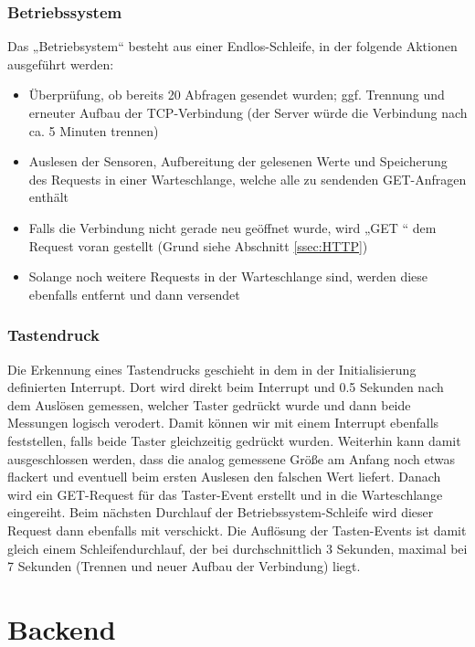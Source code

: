 \documentclass[12pt,a4paper,twoside]{article}
\begin{document}
\subsubsection{Betriebssystem}

Das „Betriebsystem“ besteht aus einer Endlos-Schleife, in der folgende Aktionen ausgeführt werden:
\begin{itemize}
 \item Überprüfung, ob bereits 20 Abfragen gesendet wurden; ggf. Trennung und erneuter Aufbau der TCP-Verbindung (der Server würde die Verbindung nach ca. 5 Minuten trennen)
 \item Auslesen der Sensoren, Aufbereitung der gelesenen Werte und Speicherung des Requests in einer Warteschlange, welche alle zu sendenden GET-Anfragen enthält
 \item Falls die Verbindung nicht gerade neu geöffnet wurde, wird „GET “ dem Request voran gestellt (Grund siehe Abschnitt \ref{ssec:HTTP})
 \item Solange noch weitere Requests in der Warteschlange sind, werden diese ebenfalls entfernt und dann versendet
\end{itemize}

\subsubsection{Tastendruck}
Die Erkennung eines Tastendrucks geschieht in dem in der Initialisierung definierten Interrupt. Dort wird direkt beim Interrupt und 0.5 Sekunden nach dem Auslösen gemessen, welcher Taster gedrückt wurde und dann beide Messungen logisch verodert. Damit können wir mit einem Interrupt ebenfalls feststellen, falls beide Taster gleichzeitig gedrückt wurden. Weiterhin kann damit ausgeschlossen werden, dass die analog gemessene Größe am Anfang noch etwas flackert und eventuell beim ersten Auslesen den falschen Wert liefert. Danach wird ein GET-Request für das Taster-Event erstellt und in die Warteschlange eingereiht. Beim nächsten Durchlauf der Betriebssystem-Schleife wird dieser Request dann ebenfalls mit verschickt. Die Auflösung der Tasten-Events ist damit gleich einem Schleifendurchlauf, der bei durchschnittlich 3 Sekunden, maximal bei 7 Sekunden (Trennen und neuer Aufbau der Verbindung) liegt. 

\section{Backend}\label{sec:backend}
\end{document}

